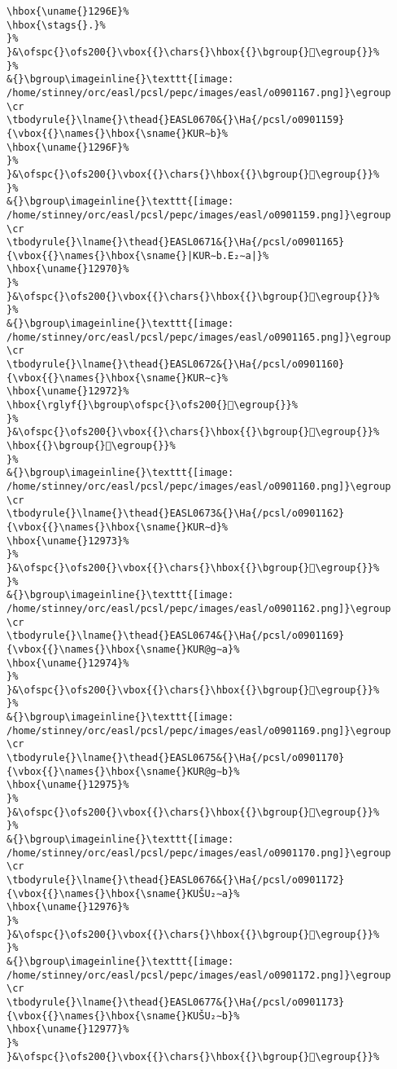 \begin{verbatim}
\hbox{\uname{}1296E}%
\hbox{\stags{}.}%
}%
}&\ofspc{}\ofs200{}\vbox{{}\chars{}\hbox{{}\bgroup{}𒥮\egroup{}}%
}%
&{}\bgroup\imageinline{}\texttt{[image: /home/stinney/orc/easl/pcsl/pepc/images/easl/o0901167.png]}\egroup
\cr
\tbodyrule{}\lname{}\thead{}EASL0670&{}\Ha{/pcsl/o0901159}{\vbox{{}\names{}\hbox{\sname{}KUR∼b}%
\hbox{\uname{}1296F}%
}%
}&\ofspc{}\ofs200{}\vbox{{}\chars{}\hbox{{}\bgroup{}𒥯\egroup{}}%
}%
&{}\bgroup\imageinline{}\texttt{[image: /home/stinney/orc/easl/pcsl/pepc/images/easl/o0901159.png]}\egroup
\cr
\tbodyrule{}\lname{}\thead{}EASL0671&{}\Ha{/pcsl/o0901165}{\vbox{{}\names{}\hbox{\sname{}|KUR∼b.E₂∼a|}%
\hbox{\uname{}12970}%
}%
}&\ofspc{}\ofs200{}\vbox{{}\chars{}\hbox{{}\bgroup{}𒥰\egroup{}}%
}%
&{}\bgroup\imageinline{}\texttt{[image: /home/stinney/orc/easl/pcsl/pepc/images/easl/o0901165.png]}\egroup
\cr
\tbodyrule{}\lname{}\thead{}EASL0672&{}\Ha{/pcsl/o0901160}{\vbox{{}\names{}\hbox{\sname{}KUR∼c}%
\hbox{\uname{}12972}%
\hbox{\rglyf{}\bgroup\ofspc{}\ofs200{}𒥲\egroup{}}%
}%
}&\ofspc{}\ofs200{}\vbox{{}\chars{}\hbox{{}\bgroup{}𒥱\egroup{}}%
\hbox{{}\bgroup{}𒥲\egroup{}}%
}%
&{}\bgroup\imageinline{}\texttt{[image: /home/stinney/orc/easl/pcsl/pepc/images/easl/o0901160.png]}\egroup
\cr
\tbodyrule{}\lname{}\thead{}EASL0673&{}\Ha{/pcsl/o0901162}{\vbox{{}\names{}\hbox{\sname{}KUR∼d}%
\hbox{\uname{}12973}%
}%
}&\ofspc{}\ofs200{}\vbox{{}\chars{}\hbox{{}\bgroup{}𒥳\egroup{}}%
}%
&{}\bgroup\imageinline{}\texttt{[image: /home/stinney/orc/easl/pcsl/pepc/images/easl/o0901162.png]}\egroup
\cr
\tbodyrule{}\lname{}\thead{}EASL0674&{}\Ha{/pcsl/o0901169}{\vbox{{}\names{}\hbox{\sname{}KUR@g∼a}%
\hbox{\uname{}12974}%
}%
}&\ofspc{}\ofs200{}\vbox{{}\chars{}\hbox{{}\bgroup{}𒥴\egroup{}}%
}%
&{}\bgroup\imageinline{}\texttt{[image: /home/stinney/orc/easl/pcsl/pepc/images/easl/o0901169.png]}\egroup
\cr
\tbodyrule{}\lname{}\thead{}EASL0675&{}\Ha{/pcsl/o0901170}{\vbox{{}\names{}\hbox{\sname{}KUR@g∼b}%
\hbox{\uname{}12975}%
}%
}&\ofspc{}\ofs200{}\vbox{{}\chars{}\hbox{{}\bgroup{}𒥵\egroup{}}%
}%
&{}\bgroup\imageinline{}\texttt{[image: /home/stinney/orc/easl/pcsl/pepc/images/easl/o0901170.png]}\egroup
\cr
\tbodyrule{}\lname{}\thead{}EASL0676&{}\Ha{/pcsl/o0901172}{\vbox{{}\names{}\hbox{\sname{}KUŠU₂∼a}%
\hbox{\uname{}12976}%
}%
}&\ofspc{}\ofs200{}\vbox{{}\chars{}\hbox{{}\bgroup{}𒥶\egroup{}}%
}%
&{}\bgroup\imageinline{}\texttt{[image: /home/stinney/orc/easl/pcsl/pepc/images/easl/o0901172.png]}\egroup
\cr
\tbodyrule{}\lname{}\thead{}EASL0677&{}\Ha{/pcsl/o0901173}{\vbox{{}\names{}\hbox{\sname{}KUŠU₂∼b}%
\hbox{\uname{}12977}%
}%
}&\ofspc{}\ofs200{}\vbox{{}\chars{}\hbox{{}\bgroup{}𒥷\egroup{}}%

\end{verbatim}
